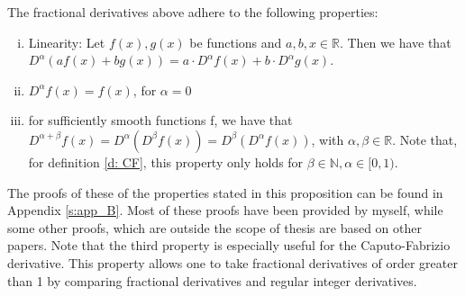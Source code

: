\begin{proposition}\label{p: calculus}
    The fractional derivatives above adhere to the following properties:
    \begin{enumerate}[(i)]
        \item Linearity: Let \(f(x), g(x)\) be functions and \(a, b, x \in \mathbb{R}\). Then we have that \(D^{\alpha} \left(a f(x) + b g(x)\right) = a \cdot D^{\alpha} f(x) + b \cdot D^{\alpha} g(x)\).
        \item \(D^{\alpha} f(x) = f(x)\), for \(\alpha = 0\) 
        \item for sufficiently smooth functions f, we have that \(D^{\alpha + \beta} f(x) = D^\alpha(D^\beta f(x)) =  D^\beta(D^\alpha f(x))\), with \(\alpha, \beta \in \mathbb{R}\). Note that, for definition \ref{d: CF}, this property only holds for \(\beta \in \mathbb{N}, \alpha \in [0,1)\).
    \end{enumerate}
        
    
\end{proposition}

The proofs of these of the properties stated in this proposition can be found in Appendix \ref{s:app_B}. Most of these proofs have been provided by myself, while some other proofs, which are outside the scope of thesis are based on other papers. Note that the third property is especially useful for the Caputo-Fabrizio derivative. This property allows one to take fractional derivatives of order greater than 1 by comparing fractional derivatives and regular integer derivatives.

